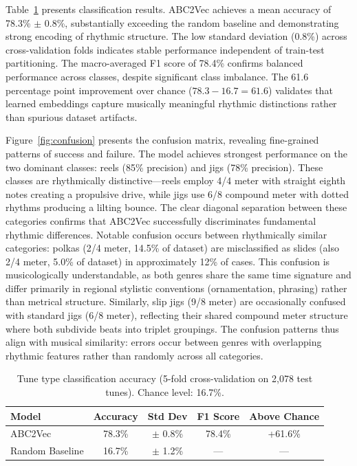 \documentclass[]{interact}
\theoremstyle{plain}
\theoremstyle{definition}
\theoremstyle{remark}
\begin{document}
Table~\ref{tab:tune_type} presents classification results. ABC2Vec achieves a mean accuracy of 78.3\% $\pm$ 0.8\%, substantially exceeding the random baseline and demonstrating strong encoding of rhythmic structure. The low standard deviation (0.8\%) across cross-validation folds indicates stable performance independent of train-test partitioning. The macro-averaged F1 score of 78.4\% confirms balanced performance across classes, despite significant class imbalance. The 61.6 percentage point improvement over chance ($78.3 - 16.7 = 61.6$) validates that learned embeddings capture musically meaningful rhythmic distinctions rather than spurious dataset artifacts.

Figure~\ref{fig:confusion} presents the confusion matrix, revealing fine-grained patterns of success and failure. The model achieves strongest performance on the two dominant classes: reels (85\% precision) and jigs (78\% precision). These classes are rhythmically distinctive---reels employ 4/4 meter with straight eighth notes creating a propulsive drive, while jigs use 6/8 compound meter with dotted rhythms producing a lilting bounce. The clear diagonal separation between these categories confirms that ABC2Vec successfully discriminates fundamental rhythmic differences. Notable confusion occurs between rhythmically similar categories: polkas (2/4 meter, 14.5\% of dataset) are misclassified as slides (also 2/4 meter, 5.0\% of dataset) in approximately 12\% of cases. This confusion is musicologically understandable, as both genres share the same time signature and differ primarily in regional stylistic conventions (ornamentation, phrasing) rather than metrical structure. Similarly, slip jigs (9/8 meter) are occasionally confused with standard jigs (6/8 meter), reflecting their shared compound meter structure where both subdivide beats into triplet groupings. The confusion patterns thus align with musical similarity: errors occur between genres with overlapping rhythmic features rather than randomly across all categories.

\begin{table}[!htb]
\centering
\caption{Tune type classification accuracy (5-fold cross-validation on 2,078 test tunes). Chance level: 16.7\%.}
\label{tab:tune_type}
\begin{tabular}{lcccc}
\toprule
\textbf{Model} & \textbf{Accuracy} & \textbf{Std Dev} & \textbf{F1 Score} & \textbf{Above Chance} \\
\midrule
ABC2Vec & 78.3\% & $\pm$ 0.8\% & 78.4\% & +61.6\% \\
Random Baseline & 16.7\% & $\pm$ 1.2\% & --- & --- \\
\bottomrule
\end{tabular}
\end{table}
\end{document}
